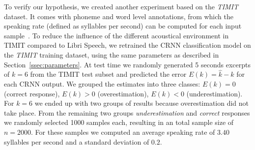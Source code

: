To verify our hypothesis, we created another experiment based on the \emph{TIMIT} dataset.
It comes with phoneme and word level annotations, from which the speaking rate (defined as syllables per second) can be computed for each input sample~\cite{Jiao16}.
To reduce the influence of the different acoustical environment in TIMIT compared to Libri Speech, we retrained the CRNN classification model on the \emph{TIMIT} training dataset, using the same parameters as described in Section~\ref{ssec:parameters}.
At test time we randomly generated 5 seconds excerpts of \(k=6\) from the TIMIT test subset and predicted the error \(E(k) = \hat{k} - k\) for each CRNN output.
We grouped the estimates into three classes: \(E(k) = 0\) (correct response), \(E(k) > 0\) (overestimation), \(E(k) < 0\) (underestimation).
For \(k=6\) we ended up with two groups of results because overestimation did not take place.
From the remaining two groups \emph{underestimation} and \emph{correct} responses we randomly selected 1000 samples each, resulting in an total sample size of \(n=2000\).
For these samples we computed an average speaking rate of \(3.40\) syllables per second and a standard deviation of \(0.2\).\par

